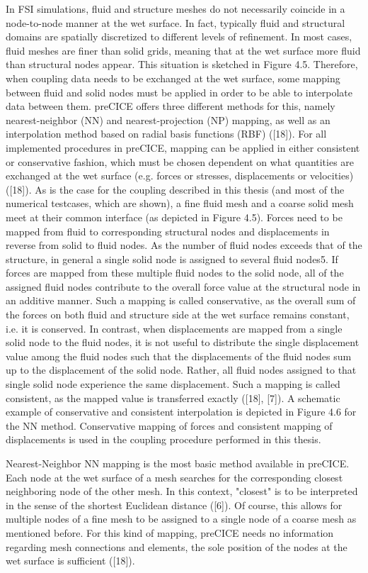 In FSI simulations, fluid and structure meshes do not necessarily coincide in a node-to-node manner at
the wet surface. In fact, typically fluid and structural domains are spatially discretized to different levels
of refinement. In most cases, fluid meshes are finer than solid grids, meaning that at the wet surface more
fluid than structural nodes appear. This situation is sketched in Figure 4.5. Therefore, when coupling
data needs to be exchanged at the wet surface, some mapping between fluid and solid nodes must be
applied in order to be able to interpolate data between them. preCICE offers three different methods
for this, namely nearest-neighbor (NN) and nearest-projection (NP) mapping, as well as an interpolation
method based on radial basis functions (RBF) ([18]).
For all implemented procedures in preCICE, mapping can be applied in either consistent or conservative
fashion, which must be chosen dependent on what quantities are exchanged at the wet surface (e.g. forces
or stresses, displacements or velocities) ([18]). As is the case for the coupling described in this thesis (and
most of the numerical testcases, which are shown), a fine fluid mesh and a coarse solid mesh meet at their
common interface (as depicted in Figure 4.5). Forces need to be mapped from fluid to corresponding
structural nodes and displacements in reverse from solid to fluid nodes. As the number of fluid nodes
exceeds that of the structure, in general a single solid node is assigned to several fluid nodes5. If forces are
mapped from these multiple fluid nodes to the solid node, all of the assigned fluid nodes contribute to the
overall force value at the structural node in an additive manner. Such a mapping is called conservative, as
the overall sum of the forces on both fluid and structure side at the wet surface remains constant, i.e. it is
conserved. In contrast, when displacements are mapped from a single solid node to the fluid nodes, it is
not useful to distribute the single displacement value among the fluid nodes such that the displacements
of the fluid nodes sum up to the displacement of the solid node. Rather, all fluid nodes assigned to that
single solid node experience the same displacement. Such a mapping is called consistent, as the mapped
value is transferred exactly ([18], [7]). A schematic example of conservative and consistent interpolation
is depicted in Figure 4.6 for the NN method. Conservative mapping of forces and consistent mapping of
displacements is used in the coupling procedure performed in this thesis.

Nearest-Neighbor
NN mapping is the most basic method available in preCICE. Each node at the wet surface of a mesh
searches for the corresponding closest neighboring node of the other mesh. In this context, "closest" is
to be interpreted in the sense of the shortest Euclidean distance ([6]). Of course, this allows for multiple
nodes of a fine mesh to be assigned to a single node of a coarse mesh as mentioned before. For this kind
of mapping, preCICE needs no information regarding mesh connections and elements, the sole position
of the nodes at the wet surface is sufficient ([18]).

